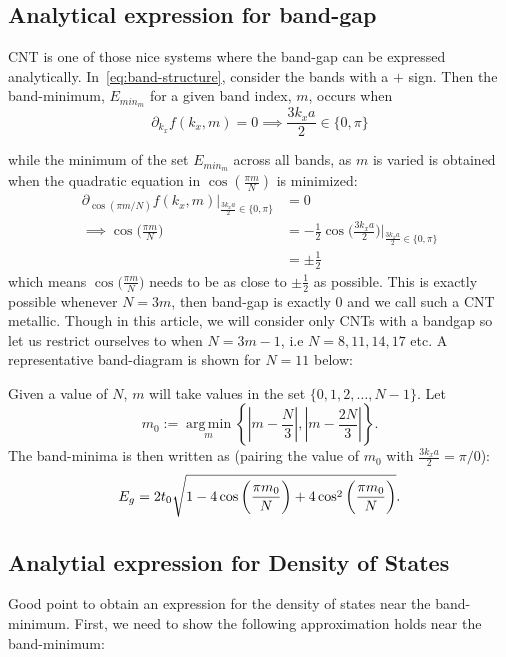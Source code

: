 \documentclass{article}
\begin{document}
\subsection{Analytical expression for band-gap}\label{sec:bandgap}
CNT is one of those nice systems where the band-gap can be expressed analytically.
In~\eqref{eq:band-structure}, consider the bands with a $+$ sign. Then
the band-minimum, $E_{min_m}$ for a given band index, $m$, occurs when
\begin{equation}
\partial_{k_x}f(k_x, m)=0 \implies \frac{3k_xa}{2} \in \{0,\pi\}
\end{equation}

while the minimum of the set $E_{min_m}$ across all bands, as $m$ is varied is obtained when the 
quadratic equation in $\cos(\frac{\pi m}{N})$ is minimized: 
\begin{equation}
\begin{split}
    \partial_{\cos(\pi m/N)}f(k_x, m)\bigg|_{\frac{3k_xa}{2} \in \{0,\pi\}} &= 0 \\
    \implies \cos\bigg(\frac{\pi m}{N}\bigg) &= -\frac{1}{2}\cos\bigg(\frac{3k_xa}{2}\bigg)\bigg|_{\frac{3k_xa}{2} \in \{0,\pi\}} \\
    &= \pm \frac{1}{2}
\end{split}
\end{equation}
 which means $\cos\bigg(\frac{\pi m}{N}\bigg)$ needs to be as close to $\pm\frac{1}{2}$ as possible. 
 This is exactly possible whenever $N = 3m$, then band-gap is exactly 0 and we call such a CNT metallic. 
 Though in this article, we will consider only CNTs with a bandgap so  
 let us restrict ourselves to when $N=3m-1$, i.e $N=8, 11, 14, 17$ etc. A representative
 band-diagram is shown for $N=11$ below: 
 

 Given a value of $N$, $m$ will take values in the set $\{0, 1, 2, \ldots, N-1\}$. Let
\[
    m_0 := \operatorname*{arg\,min}_{m} \left\{\left| m - \frac{N}{3} \right|, \left| m - \frac{2N}{3} \right|\right\}.
\]
The band-minima is then written as (pairing the value of $m_0$ with  $\frac{3k_x a}{2} = \pi /0$):
\begin{equation}\label{eq:bandgap}
    E_g = 2t_0\sqrt{1-4\cos\bigg{(}\frac{\pi m_0}{N}\bigg{)}+4\cos^2\bigg{(}\frac{\pi m_0}{N}\bigg{)} } .
\end{equation}

\subsection{Analytial expression for Density of States}
Good point to obtain an expression for the density of states near the band-minimum. 
First, we need to show the following approximation holds near the band-minimum:
\end{document}
